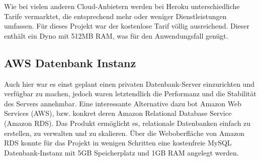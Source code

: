 Wie bei vielen anderen Cloud-Anbietern werden bei Heroku unterschiedliche Tarife vermarktet, die entsprechend mehr oder weniger Dienstleistungen umfassen. Für dieses Projekt war der kostenlose Tarif völlig ausreichend. Dieser enthält ein Dyno mit 512MB RAM, was für den Anwendungsfall genügt. 

\subsection{AWS Datenbank Instanz}

Auch hier war es einst geplant einen privaten Datenbank-Server einzurichten und verfügbar zu machen, jedoch waren letztendlich die Performanz und die Stabilität des Servers annehmbar. Eine interessante Alternative dazu bot Amazon Web Services (\acs{AWS}), bzw. konkret deren Amazon Relational Database Service (Amazon RDS). Das Produkt ermöglicht es, relationale Datenbanken einfach zu erstellen, zu verwalten und zu skalieren\cite{Gaut2016}. Über die Weboberfläche von Amazon RDS konnte für das Projekt in wenigen Schritten eine kostenfreie MySQL Datenbank-Instanz mit 5GB Speicherplatz und 1GB RAM angelegt werden.
